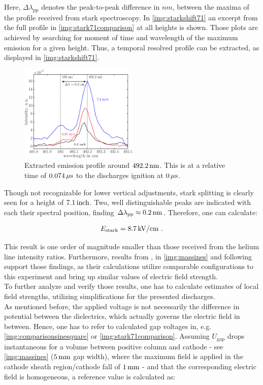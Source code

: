 \documentclass[a4paper,10pt,twoside]{article}
\newcommand{\ix}[1]{_\text{#1}}
\begin{document}
		Here, $\Delta\lambda\ix{pp}$ denotes the peak-to-peak difference in $\unit{nm}$, between the maxima of the profile received from stark spectroscopy. In \autoref{img:starkshift71} an excerpt from the full profile in \autoref{img:stark71comparison} at all heights is shown. Those plots are achieved by searching for moment of time and wavelength of the maximum emission for a given height. Thus, a temporal resolved profile can be extracted, as displayed in \autoref{img:starkshift71}.
		
			\begin{figure}[t!]
				\centering
				\includegraphics[width=0.5\textwidth]{figures/stark/combinations/stark_shiftallheights.pdf}
				\caption{Extracted emission profile around $\unit[492.2]{nm}$. This is at a relative time of $\unit[0.074]{\mu s}$ to the discharges ignition at $\unit[0]{\mu s}$.}
				\label{img:starkshift71}
			\end{figure}
		
		Though not recognizable for lower vertical adjustments, stark splitting is clearly seen for a height of $\unit[7.1]{inch}$. Two, well distinguishable peaks are indicated with each their spectral position, finding $\Delta\lambda\ix{pp}\approx\unit[0.2]{nm}$. Therefore, one can calculate:
		
			\begin{align}
				E\ix{stark}=\unit[8.7]{kV/cm} \,\,.\nonumber
			\end{align}
		
		This result is one order of magnitude smaller than those received from the helium line intensity ratios. Furthermore, results from \cite{Massines}, \cite{0022-3727-36-1-306} in \autoref{img:massines} and following support those findings, as their calculations utilize comparable configurations to this experiment and bring up similar values of electric field strength.\\
		To further analyze and verify those results, one has to calculate estimates of local field strengths, utilizing simplifications for the presented discharges.\\
		As mentioned before, the applied voltage is not necessarily the difference in potential between the dielectrics, which actually governs the electric field in between. Hence, one has to refer to calculated gap voltages in, e.g. \autoref{img:comparisonsinesquare} or \autoref{img:stark71comparison}. Assuming $U\ix{gap}$  drops instantaneous for a volume between positive column and cathode - see \autoref{img:massines} ($\unit[5]{mm}$ gap width), where the maximum field is applied in the cathode sheath region/cathode fall of $\unit[1]{mm}$ - and that the corresponding electric field is homogeneous, a reference value is calculated as:
		
\end{document}
